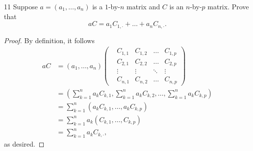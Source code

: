\documentclass{extarticle}
\newenvironment{problem}[1]{\begin{prob*}{#1}{}}{\end{prob*}}
\begin{document}
\begin{problem}{11}
Suppose $a = (a_1, \dots, a_n)$ is a $1$-by-$n$ matrix and $C$ is an $n$-by-$p$ matrix.  Prove that
\begin{equation*}
aC = a_1C_{1,\cdot} + \dots + a_nC_{n,\cdot}.
\end{equation*}
\end{problem}
\begin{proof}
By definition, it follows
\begin{align*}
aC &= (a_1, \dots, a_n)\begin{pmatrix}
		&C_{1,1} &C_{1,2}    &\dots    &C_{1, p} \\ 
		&C_{2,1} &C_{2,2}    &\dots    &C_{2, p} \\
		&\vdots   &\vdots      & \ddots &\vdots \\ 
		&C_{n,1} &C_{n, 2} &\dots    &C_{n,p}\end{pmatrix}\\
&= \left(\sum_{k = 1}^n a_k C_{k, 1}, \sum_{k = 1}^n a_k C_{k, 2}, \dots, \sum_{k = 1}^n a_k C_{k, p}  \right)\\
&= \sum_{k = 1}^n\left(a_kC_{k,1}, \dots, a_kC_{k, p}\right)\\
&= \sum_{k = 1}^na_k\left(C_{k,1}, \dots, C_{k, p}\right)\\
&= \sum_{k = 1}^na_kC_{k, \cdot},
\end{align*}
as desired.
\end{proof}
\end{document}
